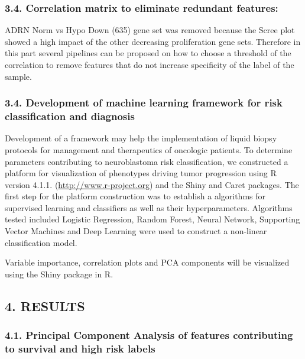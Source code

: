 \documentclass[
]{article}
\begin{document}
\hypertarget{correlation-matrix-to-eliminate-redundant-features}{%
\subsubsection{3.4. Correlation matrix to eliminate redundant
features:}\label{correlation-matrix-to-eliminate-redundant-features}}

ADRN Norm vs Hypo Down (635) gene set was removed because the Scree plot
showed a high impact of the other decreasing proliferation gene sets.
Therefore in this part several pipelines can be proposed on how to
choose a threshold of the correlation to remove features that do not
increase specificity of the label of the sample.

\hypertarget{development-of-machine-learning-framework-for-risk-classification-and-diagnosis}{%
\subsubsection{3.4. Development of machine learning framework for risk
classification and
diagnosis}\label{development-of-machine-learning-framework-for-risk-classification-and-diagnosis}}

Development of a framework may help the implementation of liquid biopsy
protocols for management and therapeutics of oncologic patients. To
determine parameters contributing to neuroblastoma risk classification,
we constructed a platform for visualization of phenotypes driving tumor
progression using R version 4.1.1. (\url{http://www.r-project.org}) and
the Shiny and Caret packages. The first step for the platform
construction was to establish a algorithms for supervised learning and
classifiers as well as their hyperparameters. Algorithms tested included
Logistic Regression, Random Forest, Neural Network, Supporting Vector
Machines and Deep Learning were used to construct a non-linear
classification model.

Variable importance, correlation plots and PCA components will be
visualized using the Shiny package in R.

\hypertarget{results}{%
\subsection{4. RESULTS}\label{results}}

\hypertarget{principal-component-analysis-of-features-contributing-to-survival-and-high-risk-labels}{%
\subsubsection{4.1. Principal Component Analysis of features
contributing to survival and high risk
labels}\label{principal-component-analysis-of-features-contributing-to-survival-and-high-risk-labels}}
\end{document}
